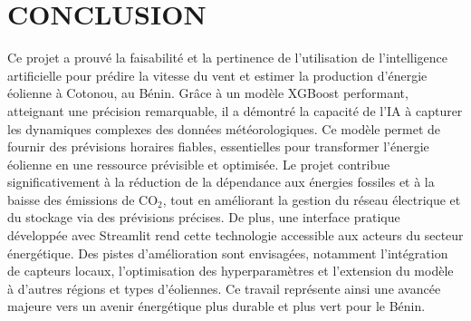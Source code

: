 \documentclass[12pt]{article}
\begin{document}
\section{CONCLUSION}
Ce projet a prouvé la faisabilité et la pertinence de l’utilisation de l’intelligence artificielle pour prédire la vitesse du vent et estimer la production d’énergie éolienne à Cotonou, au Bénin. Grâce à un modèle XGBoost performant, atteignant une précision remarquable, il a démontré la capacité de l’IA à capturer les dynamiques complexes des données météorologiques. Ce modèle permet de fournir des prévisions horaires fiables, essentielles pour transformer l’énergie éolienne en une ressource prévisible et optimisée. Le projet contribue significativement à la réduction de la dépendance aux énergies fossiles et à la baisse des émissions de CO$_2$, tout en améliorant la gestion du réseau électrique et du stockage via des prévisions précises. De plus, une interface pratique développée avec Streamlit rend cette technologie accessible aux acteurs du secteur énergétique. Des pistes d’amélioration sont envisagées, notamment l’intégration de capteurs locaux, l’optimisation des hyperparamètres et l’extension du modèle à d’autres régions et types d’éoliennes. Ce travail représente ainsi une avancée majeure vers un avenir énergétique plus durable et plus vert pour le Bénin.
\end{document}
